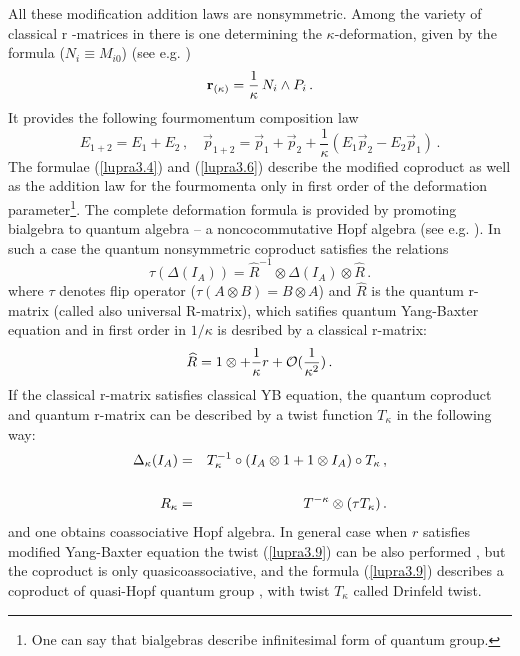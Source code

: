 \documentclass[a4paper,a4paper]{article}
\begin{document}
All these modification addition laws are nonsymmetric. Among the
variety of classical r -matrices in \cite{zak} there is one
determining the $ \kappa$-deformation, given by the formula ($N_i
\equiv M_{i0}$) (see e.g. \cite{mr1})
\begin{equation}\label{lupra3.5}
{\bf r}_{(\kappa)} = \frac{1}{\kappa}\, N_{i} \wedge P_i \, .
\end{equation}
It provides the following fourmomentum composition law
\begin{equation}\label{lupra3.6}
E_{1+2} = E_{1} + E_{2} \, , \quad \overrightarrow{p}_{1+2} =
\overrightarrow{p}_{1} +  \overrightarrow{p}_{2} +
\frac{1}{\kappa} ( E_{1} \overrightarrow{p}_{2} - E_{2}
\overrightarrow{p}_{1} )\, .
\end{equation}
The formulae (\ref{lupra3.4}) and (\ref{lupra3.6}) describe the
modified coproduct as well as the addition law for the fourmomenta
only in first order of the deformation parameter\footnote{One can
say that bialgebras describe infinitesimal form of quantum
group.}. The complete deformation formula is provided by promoting
bialgebra to quantum algebra -- a noncocommutative Hopf algebra
(see e.g. \cite{smaj}). In such a case  the quantum nonsymmetric
coproduct satisfies the relations
\begin{equation}\label{lupra3.7}
\tau (\Delta (I_A)) = \widehat{R}^{-1} \otimes \Delta (I_A)
\otimes \widehat{R}\, .
\end{equation}
where $\tau$ denotes flip operator ($\tau (A\otimes B) = B\otimes
A$) and $ \widehat{R}$ is the quantum r-matrix (called also
universal R-matrix), which satifies quantum Yang-Baxter equation
and in first order in $1/\kappa$ is desribed by a classical
r-matrix:
\begin{equation}\label{lupra3.8}
  \widehat{R} = 1 \otimes + \frac{1}{\kappa} r + {\cal O }
  (\frac{1}{\kappa^2})\, .
\end{equation}
If the classical r-matrix satisfies classical YB equation, the
quantum coproduct and quantum r-matrix can be described by a
twist function $T_\kappa$ in the following way:
\begin{eqnarray}\label{lupra3.9}
\Delta_\kappa (I_A) & = & T^{-1}_\kappa \circ (I_A \otimes 1 + 1
\otimes I_A) \circ T _\kappa \, ,
\\ \cr
R_\kappa & = & T^{-\kappa} \otimes (\tau T_\kappa) \, .
\end{eqnarray}
and one obtains coassociative Hopf algebra. In general case when
$r$ satisfies modified Yang-Baxter equation  the twist
(\ref{lupra3.9}) can be also performed \cite{drinf}, but the
coproduct is only quasicoassociative, and the formula
(\ref{lupra3.9}) describes a coproduct of quasi-Hopf quantum group
\cite{drinf}, with twist $T_\kappa$ called Drinfeld twist.
\end{document}
